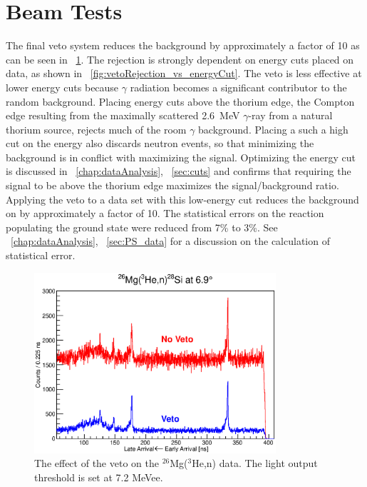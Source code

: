 \section{Beam Tests}

The final veto system reduces the background by approximately a factor of 10 as can be seen in {\fig}~\ref{fig:veto_26Mg}.  The rejection is strongly dependent on energy cuts placed on data, as shown in {\fig}~\ref{fig:vetoRejection_vs_energyCut}.  The veto is less effective at lower energy cuts because $\gamma$ radiation becomes a significant contributor to the random background.  Placing energy cuts above the thorium edge, the Compton edge resulting from the maximally scattered 2.6~MeV $\gamma$-ray \citep{PDG} from a natural thorium source, rejects much of the room $\gamma$ background.  Placing a such a high cut on the energy also discards neutron events, so that minimizing the background is in conflict with maximizing the signal.  Optimizing the energy cut is discussed in {\chap}~\ref{chap:dataAnalysis}, {\sect}~\ref{sec:cuts} and confirms that requiring the signal to be above the thorium edge maximizes the signal/background ratio.  Applying the veto to a data set with this low-energy cut reduces the background on \MgReaction by approximately a factor of 10.  The statistical errors on the reaction populating the ground state were reduced from 7\% to 3\%.  See {\chap}~\ref{chap:dataAnalysis}, {\sect}~\ref{sec:PS_data} for a discussion on the calculation of statistical error.
\begin{figure}[!htbp]
\centering
\includegraphics[width=0.8\textwidth]{figures/26Mg_vetoEffect.eps}
\caption[Effect of the veto on the timing spectrum due to \MgReaction.]{\label{fig:vetoData}The effect of the veto on the $^{26}$Mg($^3$He,n) data.  The light output threshold is set at 7.2 MeVee.}
\label{fig:veto_26Mg}
\end{figure}
  

